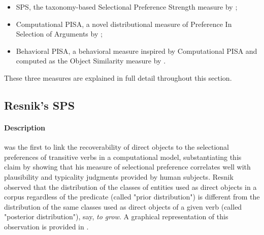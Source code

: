 \begin{itemize}
    \item SPS, the taxonomy-based Selectional Preference Strength measure by \textcite{Resnik1993, Resnik1996};
    \item Computational PISA, a novel distributional measure of Preference In Selection of Arguments by \textcite{CappelliLenciPISA};
    \item Behavioral PISA, a behavioral measure inspired by Computational PISA and computed as the Object Similarity measure by \textcite{Medina2007}.
\end{itemize}

These three measures are explained in full detail throughout this section.


\subsection{Resnik's SPS}

\paragraph{Description} \textcite{Resnik1993, Resnik1996} was the first to link the recoverability of direct objects to the selectional preferences of transitive verbs in a computational model, substantiating this claim by showing that his measure of selectional preference correlates well with plausibility and typicality judgments provided by human subjects. Resnik observed that the distribution of the classes of entities used as direct objects in a corpus regardless of the predicate (called "prior distribution") is different from the distribution of the same classes used as direct objects of a given verb (called "posterior distribution"), say, \textit{to grow}. A graphical representation of this observation is provided in .

